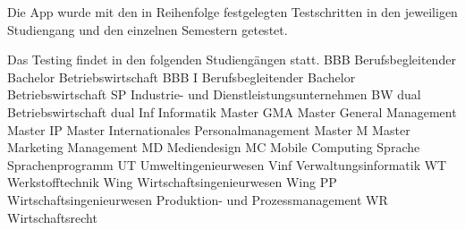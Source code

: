 Die App wurde mit den in Reihenfolge festgelegten Testschritten in den jeweiligen Studiengang und den einzelnen Semestern getestet.\newline
\newline

Das Testing  findet in den  folgenden Studiengängen statt.\newline
\newline
BBB  Berufsbegleitender Bachelor Betriebswirtschaft\newline
BBB I  Berufsbegleitender Bachelor Betriebswirtschaft SP Industrie- und Dienstleistungsunternehmen\newline
BW dual  Betriebswirtschaft dual\newline
Inf  Informatik\newline
Master GMA  Master General Management\newline
Master IP  Master Internationales Personalmanagement\newline
Master M  Master Marketing Management\newline
MD  Mediendesign\newline
MC  Mobile Computing\newline
Sprache  Sprachenprogramm\newline
UT  Umweltingenieurwesen\newline
Vinf  Verwaltungsinformatik\newline
WT  Werkstofftechnik\newline
Wing  Wirtschaftsingenieurwesen\newline
Wing PP  Wirtschaftsingenieurwesen Produktion- und Prozessmanagement\newline
WR  Wirtschaftsrecht\newline





